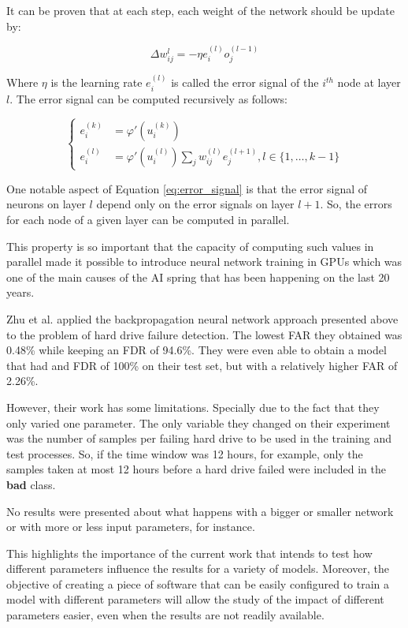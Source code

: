 It can be proven \cite{amari1993backpropagation} that at each step, each weight of the network should be update by:


$$
\Delta w_{ij}^{l} = -\eta e_i^{(l)} o_{j}^{(l-1)}
$$

Where $\eta$ is the learning rate $e_i^{(l)}$ is called the error signal of the $i^{th}$ node at layer $l$.
The error signal can be computed recursively as follows:

\begin{equation}\label{eq:error_signal}
\begin{cases}
    e_i^{(k)} &= \varphi '(u_i^{(k)}) \\
    e_i^{(l)} &= \varphi '(u_i^{(l)}) \sum_j w_{ij}^{(l)}e_j^{(l+1)}, l \in \{1,\dots,k-1\}
\end{cases}
\end{equation}

One notable aspect of Equation \ref{eq:error_signal} is that the error signal of neurons on layer $l$ depend only on the error signals on layer $l+1$.
So, the errors for each node of a given layer can be computed in parallel.

This property is so important that the capacity of computing such values in parallel made it possible to introduce neural network training in GPUs \cite{steinkraus2005using} which was one of the main causes of the AI spring that has been happening on the last 20 years.

Zhu et al. \cite{Zhu13} applied the backpropagation neural network approach presented above to the problem of hard drive failure detection.
The lowest FAR they obtained was 0.48\% while keeping an FDR of 94.6\%.
They were even able to obtain a model that had and FDR of 100\% on their test set, but with a relatively higher FAR of 2.26\%.

However, their work has some limitations.
Specially due to the fact that they only varied one parameter.
The only variable they changed on their experiment was the number of samples per failing hard drive to be used in the training and test processes.
So, if the time window was 12 hours, for example, only the samples taken at most 12 hours before a hard drive failed were included in the \textbf{bad} class.

No results were presented about what happens with a bigger or smaller network or with more or less input parameters, for instance.

This highlights the importance of the current work that intends to test how different parameters influence the results for a variety of models.
Moreover, the objective of creating a piece of software that can be easily configured to train a model with different parameters will allow the study of the impact of different parameters easier, even when the results are not readily available. 

